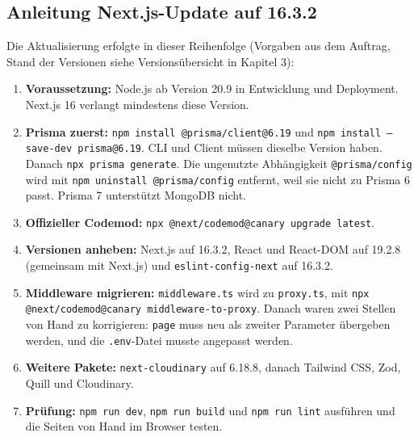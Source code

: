 \documentclass[11pt,a4paper]{article}
\let\oldsubsection\subsection
\renewcommand{\subsection}{\needspace{6\baselineskip}\oldsubsection}
\begin{document}
\subsection{Anleitung Next.js-Update auf 16.3.2}
Die Aktualisierung erfolgte in dieser Reihenfolge (Vorgaben aus dem Auftrag, Stand der Versionen siehe Versionsübersicht in Kapitel 3):
\begin{enumerate}[nosep]
  \item \textbf{Voraussetzung:} Node.js ab Version 20.9 in Entwicklung und Deployment. Next.js 16 verlangt mindestens diese Version.
  \item \textbf{Prisma zuerst:} \texttt{npm install @prisma/client@6.19} und \texttt{npm install --save-dev prisma@6.19}. CLI und Client müssen dieselbe Version haben. Danach \texttt{npx prisma generate}. Die ungenutzte Abhängigkeit \texttt{@prisma/config} wird mit \texttt{npm uninstall @prisma/config} entfernt, weil sie nicht zu Prisma 6 passt. Prisma 7 unterstützt MongoDB nicht.
  \item \textbf{Offizieller Codemod:} \texttt{npx @next/codemod@canary upgrade latest}.
  \item \textbf{Versionen anheben:} Next.js auf 16.3.2, React und React-DOM auf 19.2.8 (gemeinsam mit Next.js) und \texttt{eslint-config-next} auf 16.3.2.
  \item \textbf{Middleware migrieren:} \texttt{middleware.ts} wird zu \texttt{proxy.ts}, mit \texttt{npx @next/codemod@canary middleware-to-proxy}. Danach waren zwei Stellen von Hand zu korrigieren: \texttt{page} muss neu als zweiter Parameter übergeben werden, und die \texttt{.env}-Datei musste angepasst werden.
  \item \textbf{Weitere Pakete:} \texttt{next-cloudinary} auf 6.18.8, danach Tailwind CSS, Zod, Quill und Cloudinary.
  \item \textbf{Prüfung:} \texttt{npm run dev}, \texttt{npm run build} und \texttt{npm run lint} ausführen und die Seiten von Hand im Browser testen.
\end{enumerate}
\end{document}

